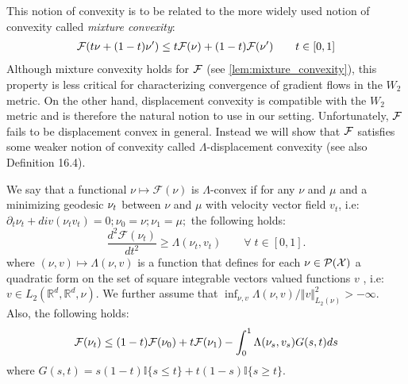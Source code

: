 This notion of convexity is to be related to the more widely used notion of convexity called \textit{mixture convexity}:
\begin{align}
	{{\mathcal F}}(t\nu +(1-t)\nu')\leq t{{\mathcal F}}(\nu)+(1-t){{\mathcal F}}(\nu') \qquad t\in [0,1]
\end{align}
Although mixture convexity holds for ${{\mathcal F}}$ (see \cref{lem:mixture_convexity}), this property is less critical for characterizing convergence of gradient flows in the $W_2$ metric. On the other hand, displacement convexity is compatible with the $W_2$ metric \cite{Bottou:2017} and is therefore the natural notion to use in our setting. Unfortunately, ${{\mathcal F}}$ fails to be displacement convex in general. Instead we will show that ${{\mathcal F}}$ satisfies some weaker notion of convexity called $\Lambda$-displacement convexity (see also \cite{Villani:2009} Definition 16.4).
%
\begin{definition}\label{def:lambda-convexity}
We say that a functional $\nu\mapsto\mathcal{F}(\nu)$ is $\Lambda$-convex
if for any $\nu$ and $\mu$ and a minimizing geodesic $\text{\ensuremath{\nu_{t}}}$
between $\nu$ and $\mu$ with velocity vector field $v_{t}$, i.e:
$\partial_{t}\nu_{t}+div(\nu_{t}v_{t})=0;\nu_{0}=\nu;\nu_{1}=\mu;$
the following holds:
\begin{equation}\label{eq:lambda_displacement_convex}
\frac{d^{2}\mathcal{F}(\nu_{t})}{dt^{2}}\geq\Lambda(\nu_{t},v_{t})\qquad\forall\; t\in[0,1].
\end{equation}
where $(\nu,v)\mapsto\Lambda(\nu,v)$
is a function that defines for each $\nu \in \mathcal{P}({{\mathcal X}})$
a quadratic form on the set of square integrable vectors valued functions
$v$ , i.e: $v\in L_{2}(\mathbb{R}^{d},\mathbb{R}^{d},\nu)$. We
further assume that $\inf_{\nu,v}\Lambda(\nu,v)/\Vert v\Vert_{L_{2}(\nu)}^{2}>-\infty$. 
Also, the following holds:
\begin{equation}
{{\mathcal F}}(\nu_{t})\leq(1-t){{\mathcal F}}(\nu_{0})+t{{\mathcal F}}(\nu_{1})-\int_{0}^{1}\Lambda(\nu_{s},v_{s})G(s,t)ds\label{eq:integral_lambda_convexity}
\end{equation}
where $G(s,t)=s(1-t) \mathbb{I}\{s\leq t\}
+t(1-s) \mathbb{I}\{s\geq t\}$.
\end{definition}

